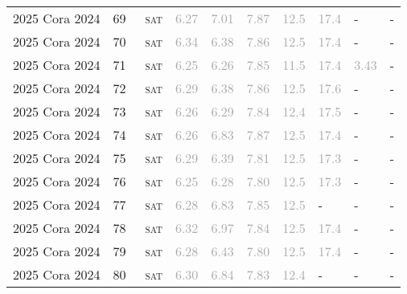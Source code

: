 \begin{center}
{\begin{longtable}{@{}llllllllll@{}}
2025 Cora 2024 & 69 & ~\textsc{sat} & \textcolor{darkgray}{6.27} & \textcolor{darkgray}{7.01} & \textcolor{darkgray}{7.87} & \textcolor{darkgray}{12.5} & \textcolor{darkgray}{17.4} & - & - \\
2025 Cora 2024 & 70 & ~\textsc{sat} & \textcolor{darkgray}{6.34} & \textcolor{darkgray}{6.38} & \textcolor{darkgray}{7.86} & \textcolor{darkgray}{12.5} & \textcolor{darkgray}{17.4} & - & - \\
2025 Cora 2024 & 71 & ~\textsc{sat} & \textcolor{darkgray}{6.25} & \textcolor{darkgray}{6.26} & \textcolor{darkgray}{7.85} & \textcolor{darkgray}{11.5} & \textcolor{darkgray}{17.4} & \textcolor{darkgray}{3.43} & - \\
2025 Cora 2024 & 72 & ~\textsc{sat} & \textcolor{darkgray}{6.29} & \textcolor{darkgray}{6.38} & \textcolor{darkgray}{7.86} & \textcolor{darkgray}{12.5} & \textcolor{darkgray}{17.6} & - & - \\
2025 Cora 2024 & 73 & ~\textsc{sat} & \textcolor{darkgray}{6.26} & \textcolor{darkgray}{6.29} & \textcolor{darkgray}{7.84} & \textcolor{darkgray}{12.4} & \textcolor{darkgray}{17.5} & - & - \\
2025 Cora 2024 & 74 & ~\textsc{sat} & \textcolor{darkgray}{6.26} & \textcolor{darkgray}{6.83} & \textcolor{darkgray}{7.87} & \textcolor{darkgray}{12.5} & \textcolor{darkgray}{17.4} & - & - \\
2025 Cora 2024 & 75 & ~\textsc{sat} & \textcolor{darkgray}{6.29} & \textcolor{darkgray}{6.39} & \textcolor{darkgray}{7.81} & \textcolor{darkgray}{12.5} & \textcolor{darkgray}{17.3} & - & - \\
2025 Cora 2024 & 76 & ~\textsc{sat} & \textcolor{darkgray}{6.25} & \textcolor{darkgray}{6.28} & \textcolor{darkgray}{7.80} & \textcolor{darkgray}{12.5} & \textcolor{darkgray}{17.3} & - & - \\
2025 Cora 2024 & 77 & ~\textsc{sat} & \textcolor{darkgray}{6.28} & \textcolor{darkgray}{6.83} & \textcolor{darkgray}{7.85} & \textcolor{darkgray}{12.5} & - & - & - \\
2025 Cora 2024 & 78 & ~\textsc{sat} & \textcolor{darkgray}{6.32} & \textcolor{darkgray}{6.97} & \textcolor{darkgray}{7.84} & \textcolor{darkgray}{12.5} & \textcolor{darkgray}{17.4} & - & - \\
2025 Cora 2024 & 79 & ~\textsc{sat} & \textcolor{darkgray}{6.28} & \textcolor{darkgray}{6.43} & \textcolor{darkgray}{7.80} & \textcolor{darkgray}{12.5} & \textcolor{darkgray}{17.4} & - & - \\
2025 Cora 2024 & 80 & ~\textsc{sat} & \textcolor{darkgray}{6.30} & \textcolor{darkgray}{6.84} & \textcolor{darkgray}{7.83} & \textcolor{darkgray}{12.4} & - & - & - \\

\end{longtable}}
\end{center}
